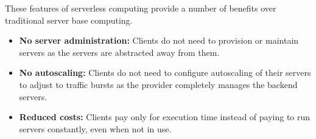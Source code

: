       These features of serverless computing provide a number of benefits over traditional server base computing.
      \begin{itemize}
        \item \textbf{No server administration:} Clients do not need to provision or maintain servers as the servers are abstracted away from them.
        \item \textbf{No autoscaling: } Clients do not need to configure autoscaling of their servers to adjust to  traffic bursts as the provider completely manages the backend servers.
        \item \textbf{Reduced costs:} Clients pay only for execution time instead of paying to run servers constantly, even when not in use.
      \end{itemize}